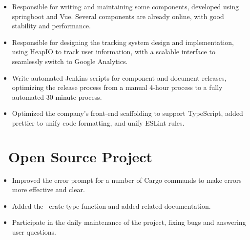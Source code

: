 \documentclass{resume}
\newcommand{\en}[1]{#1}
\newcommand{\zh}[1]{}
\begin{document}
\en{}
\zh{\datedsubsection{\textbf{\href{https://www.morningstar.com/}{晨星资讯（Morningstar, Inc. ）}}}{2019/06 -- 2020/07}}
\en{}
\zh{\role{前后端开发工程师}{组件开发}}
\begin{itemize}
      \item \en{Responsible for writing and maintaining some components, developed using springboot and Vue. Several components are already online, with good stability and performance.}
            \zh{负责独立组件的编写和维护，使用 springboot 和 Vue 开发。多个组件已经上线使用，有较好的稳定性和性能。}
      \item \en{Responsible for designing the tracking system design and implementation, using HeapIO to track user information, with a scalable interface to seamlessly switch to Google Analytics.}
            \zh{负责设计和实现前端 tracking 系统，使用 HeapIO 追踪用户信息，并预留可扩展接口，可无缝切换至 Google Analytics。}
      \item \en{Write automated Jenkins scripts for component and document releases, optimizing the release process from a manual 4-hour process to a fully automated 30-minute process.}
            \zh{为组件和文档发布编写自动化 Jenkins 脚本，将发布流程从手动 4 小时优化到全自动 30 分钟。}
      \item \en{Optimized the company's front-end scaffolding to support TypeScript, added prettier to unify code formatting, and unify ESLint rules.}
            \zh{优化公司前端脚手架，使其支持 TypeScript，添加 prettier 统一代码格式，优化统一 ESLint 规则。}
\end{itemize}

\section{\faGithubAlt\ \en{Open Source Project}\zh{开源项目}}
\en{}
\zh{\role{活跃贡献者}{\href{https://github.com/rust-lang/cargo/commits?author=hi-rustin}{136+ 个提交}}}
\begin{itemize}
      \item \en{Improved the error prompt for a number of Cargo commands to make errors more effective and clear.}
            \zh{改善了大量 Cargo 命令的错误提示，让错误更有效更清晰。}
      \item \en{Added the --crate-type function and added related documentation.}
            \zh{添加了 --crate-type 功能并添加相关文档。}
      \item \en{Participate in the daily maintenance of the project, fixing bugs and answering user questions.}
            \zh{参与项目日常维护，修复 bug 和回答用户问题。}
\end{itemize}
\end{document}
